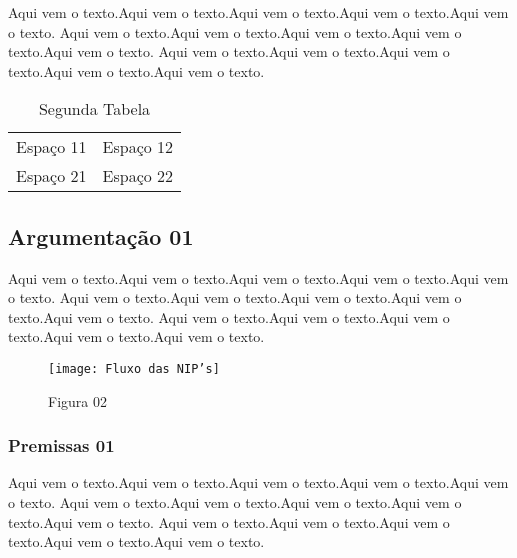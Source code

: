 \documentclass[a4paper]{article}
\begin{document}
	Aqui vem o texto.Aqui vem o texto.Aqui vem o texto.Aqui vem o texto.Aqui vem o texto.
	Aqui vem o texto.Aqui vem o texto.Aqui vem o texto.Aqui vem o texto.Aqui vem o texto.
	Aqui vem o texto.Aqui vem o texto.Aqui vem o texto.Aqui vem o texto.Aqui vem o texto. \cite{meuatalho}

\begin{table} [htb]

	\centering
	\begin{tabular}{|c|c|}
	
		Espaço 11 & Espaço 12 \\
		Espaço 21 & Espaço 22 \\
	
	\end{tabular}
	\caption{Segunda Tabela}
	\label{minha-tabela-02}

\end{table}

\subsection{Argumentação 01}

	Aqui vem o texto.Aqui vem o texto.Aqui vem o texto.Aqui vem o texto.Aqui vem o texto.
	Aqui vem o texto.Aqui vem o texto.Aqui vem o texto.Aqui vem o texto.Aqui vem o texto.
	Aqui vem o texto.Aqui vem o texto.Aqui vem o texto.Aqui vem o texto.Aqui vem o texto.

\begin{figure} [htb]

	\centering
	\texttt{[image: Fluxo das NIP's]}
	\caption{Figura 02} %
	\label{NIP's 02}

\end{figure}

\subsubsection{Premissas 01}

	Aqui vem o texto.Aqui vem o texto.Aqui vem o texto.Aqui vem o texto.Aqui vem o texto.
	Aqui vem o texto.Aqui vem o texto.Aqui vem o texto.Aqui vem o texto.Aqui vem o texto.
	Aqui vem o texto.Aqui vem o texto.Aqui vem o texto.Aqui vem o texto.Aqui vem o texto.

\newpage


	
\end{document}
